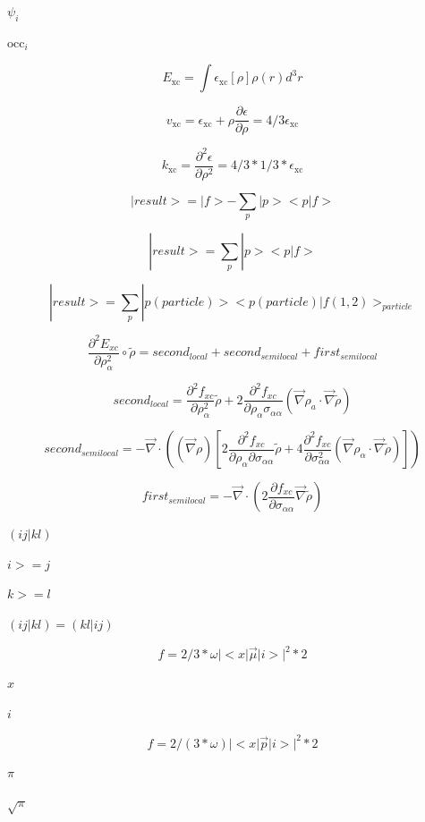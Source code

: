 \documentclass{article}
\begin{document}
$ \psi_i $
\pagebreak

$ \mathrm{occ}_i $
\pagebreak

\[
   E_\mathrm{xc} = \int\epsilon_\mathrm{xc}[\rho]\rho(r) d^3r
\]
\pagebreak

\[
   v_\mathrm{xc} = \epsilon_\mathrm{xc} + \rho\frac{\partial \epsilon}{\partial \rho}
                 = 4/3\epsilon_\mathrm{xc}
\]
\pagebreak

\[
   k_\mathrm{xc} = \frac{\partial^2\epsilon}{\partial \rho^2} = 4/3*1/3 * \epsilon_\mathrm{xc}
\]
\pagebreak

\[
  |result> = |f> - \sum_p |p><p|f>
\]
\pagebreak

\[
    | result > =  \sum_p | p > <p|f>
\]
\pagebreak

\[
|result> = \sum_p |p(particle)> <p(particle)|f(1,2)>_{particle}
\]
\pagebreak

\[
  \frac{\partial^2E_{xc}}{\partial \rho_\alpha^2}\circ\tilde\rho
     = second_{local} + second_{semilocal} + first_{semilocal}
\]
\pagebreak

\[
       second_{local} = \frac{\partial^2 f_{xc}}{\partial \rho_\alpha^2}\tilde \rho
       + 2\frac{\partial^2 f_{xc}}{\partial \rho_\alpha\sigma_{\alpha\alpha}}
           \left(\vec\nabla \rho_a\cdot \vec \nabla\tilde\rho\right)
\]
\pagebreak

\[
     second_{semilocal} = -\vec\nabla\cdot\left((\vec\nabla\rho)
            \left[2\frac{\partial^2 f_{xc}}{\partial\rho_\alpha\partial\sigma_{\alpha\alpha}}\tilde\rho
            + 4\frac{\partial^2 f_{xc}}{\partial\sigma_{\alpha\alpha}^2}
               \left(\vec\nabla\rho_\alpha\cdot\vec\nabla\tilde\rho\right)\right]\right)
\]
\pagebreak

\[
     first_{semilocal} =
       -\vec\nabla\cdot\left(2\frac{\partial f_{xc}}{\partial\sigma_{\alpha\alpha}}\vec\nabla\tilde\rho\right)
\]
\pagebreak

$(ij|kl)$
\pagebreak

$i>=j$
\pagebreak

$k>=l$
\pagebreak

$(ij|kl)=(kl|ij)$
\pagebreak

\[
f = 2/3 * \omega |<x | \vec \mu | i >| ^2 * 2
\]
\pagebreak

$ x $
\pagebreak

$ i $
\pagebreak

\[
f = 2/(3 * \omega) |<x | \vec p | i >| ^2 * 2
\]
\pagebreak

$\pi$
\pagebreak

$\sqrt{\pi}$
\pagebreak
\end{document}
